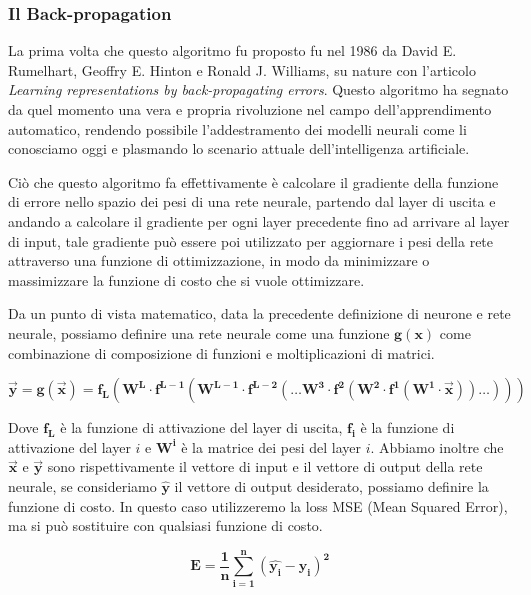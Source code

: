 \subsubsection{Il Back-propagation}

La prima volta che questo algoritmo fu proposto fu nel 1986 da David E. Rumelhart, Geoffry E. Hinton e Ronald J. Williams, su nature
con l'articolo \textit{Learning representations by back-propagating errors}.
Questo algoritmo ha segnato da quel momento una vera e propria rivoluzione nel campo dell'apprendimento automatico, rendendo possibile l'addestramento dei
modelli neurali come li conosciamo oggi e plasmando lo scenario attuale dell'intelligenza artificiale.

Ciò che questo algoritmo fa effettivamente è calcolare il gradiente della funzione di errore nello spazio dei pesi di una rete neurale, 
partendo dal layer di uscita e andando a calcolare il gradiente per ogni layer precedente fino ad arrivare al layer di input, tale gradiente può essere poi
utilizzato per aggiornare i pesi della rete attraverso una funzione di ottimizzazione, in modo da minimizzare o massimizzare la funzione di costo che si vuole ottimizzare.

Da un punto di vista matematico, data la precedente definizione di neurone e rete neurale, possiamo definire una rete neurale come una funzione $\mathbf{g(x)}$
come combinazione di composizione di funzioni e moltiplicazioni di matrici.

\begin{equation}
    \mathbf{\vec{y} = g(\vec{x}) = f_{L}(\mathbf{W^{L} \cdot f^{L-1}(W^{L-1} \cdot f^{L-2}(\dots W^{3} \cdot f^{2}(W^{2} \cdot f^{1}(W^{1} \cdot \vec{x})) \dots ))})}
\end{equation}

Dove $\mathbf{f_{L}}$ è la funzione di attivazione del layer di uscita, $\mathbf{f_{i}}$ è la funzione di attivazione del layer $i$ e $\mathbf{W^{i}}$ è la matrice dei pesi del layer $i$.
Abbiamo inoltre che $\mathbf{\vec{x}}$ e $\mathbf{\vec{y}}$ sono rispettivamente il vettore di input e il vettore di output della rete neurale, se consideriamo
$\mathbf{\hat{y}}$ il vettore di output desiderato, possiamo definire la funzione di costo. In questo caso utilizzeremo la loss MSE (Mean Squared Error), ma
si può sostituire con qualsiasi funzione di costo.

\begin{equation}
    \mathbf{E = \frac{1}{n} \sum_{i=1}^{n} (\hat{y_{i}} - y_{i})^2}
\end{equation}

